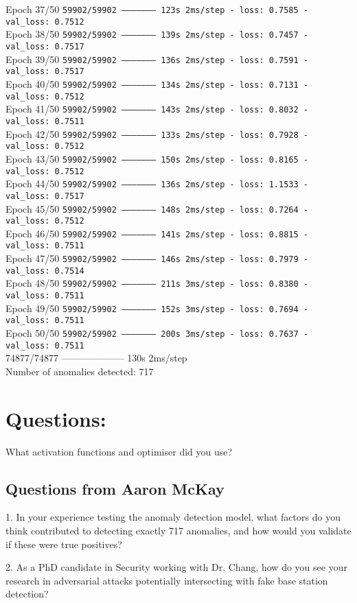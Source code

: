 Epoch 37/50
\texttt{59902/59902 -------------------- 123s 2ms/step - loss: 0.7585 - val\_loss: 0.7512}\\
Epoch 38/50
\texttt{59902/59902 -------------------- 139s 2ms/step - loss: 0.7457 - val\_loss: 0.7517}\\
Epoch 39/50
\texttt{59902/59902 -------------------- 136s 2ms/step - loss: 0.7591 - val\_loss: 0.7517}\\
Epoch 40/50
\texttt{59902/59902 -------------------- 134s 2ms/step - loss: 0.7131 - val\_loss: 0.7512}\\
Epoch 41/50
\texttt{59902/59902 -------------------- 143s 2ms/step - loss: 0.8032 - val\_loss: 0.7511}\\
Epoch 42/50
\texttt{59902/59902 -------------------- 133s 2ms/step - loss: 0.7928 - val\_loss: 0.7512}\\
Epoch 43/50
\texttt{59902/59902 -------------------- 150s 2ms/step - loss: 0.8165 - val\_loss: 0.7512}\\
Epoch 44/50
\texttt{59902/59902 -------------------- 136s 2ms/step - loss: 1.1533 - val\_loss: 0.7517}\\
Epoch 45/50
\texttt{59902/59902 -------------------- 148s 2ms/step - loss: 0.7264 - val\_loss: 0.7512}\\
Epoch 46/50
\texttt{59902/59902 -------------------- 141s 2ms/step - loss: 0.8815 - val\_loss: 0.7511}\\
Epoch 47/50
\texttt{59902/59902 -------------------- 146s 2ms/step - loss: 0.7979 - val\_loss: 0.7514}\\
Epoch 48/50
\texttt{59902/59902 -------------------- 211s 3ms/step - loss: 0.8380 - val\_loss: 0.7511}\\
Epoch 49/50
\texttt{59902/59902 -------------------- 152s 3ms/step - loss: 0.7694 - val\_loss: 0.7511}\\
Epoch 50/50
\texttt{59902/59902 -------------------- 200s 3ms/step - loss: 0.7637 - val\_loss: 0.7511}\\
74877/74877 -------------------- 130s 2ms/step\\
Number of anomalies detected: 717

\section*{Questions: }
What activation functions and optimiser did you use?

\subsection{Questions from Aaron McKay}
1. In your experience testing the anomaly detection model, what factors do you think contributed to detecting exactly 717 anomalies, and how would you validate if these were true positives?

2. As a PhD candidate in Security working with Dr. Chang, how do you see your research in adversarial attacks potentially intersecting with fake base station detection?
